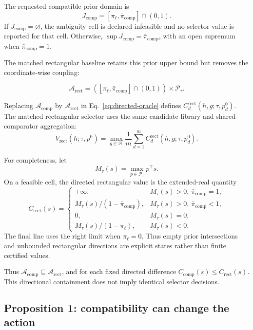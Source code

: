 \documentclass[preprint,review,12pt]{elsarticle}
\newcommand{\Acomp}{\mathcal{A}_{\mathrm{comp}}}
\newcommand{\Arect}{\mathcal{A}_{\mathrm{rect}}}
\newcommand{\Hlib}{\mathcal{H}}
\begin{document}
The requested compatible prior domain is
\[
J_{\mathrm{comp}}=
[\pi_\ell,\bar\pi_{\mathrm{comp}}]\cap(0,1).
\]
If \(J_{\mathrm{comp}}=\varnothing\), the ambiguity cell is declared infeasible
and no selector value is reported for that cell. Otherwise,
\(\sup J_{\mathrm{comp}}=\bar\pi_{\mathrm{comp}}\), with an open supremum when
\(\bar\pi_{\mathrm{comp}}=1\).

The matched rectangular baseline retains this prior upper bound but removes the
coordinate-wise coupling:

\begin{equation}
\Arect=([\pi_\ell,\bar\pi_{\mathrm{comp}}]\cap(0,1))
\times\mathcal{P}_\tau.
\label{eq:rectangular-set}
\end{equation}

Replacing \(\Acomp\) by \(\Arect\) in Eq.~\eqref{eq:directed-oracle} defines
\(C_d^{\mathrm{rect}}(h,g;\tau,p_d^0)\). The matched rectangular selector uses
the same candidate library and shared-comparator aggregation:
\begin{equation}
V_{\mathrm{rect}}(h;\tau,p^0)=
\max_{g\in\Hlib}\frac1m\sum_{d=1}^{m}
C_d^{\mathrm{rect}}(h,g;\tau,p_d^0).
\label{eq:rectangular-selector}
\end{equation}

For completeness, let
\[
M_\tau(s)=\max_{p\in\mathcal{P}_\tau}p^\top s.
\]
On a feasible cell, the directed rectangular value is the extended-real
quantity
\begin{equation}
C_{\mathrm{rect}}(s)=
\begin{cases}
+\infty,
  & M_\tau(s)>0,\ \bar\pi_{\mathrm{comp}}=1,\\
M_\tau(s)/(1-\bar\pi_{\mathrm{comp}}),
  & M_\tau(s)>0,\ \bar\pi_{\mathrm{comp}}<1,\\
0,
  & M_\tau(s)=0,\\
M_\tau(s)/(1-\pi_\ell),
  & M_\tau(s)<0.
\end{cases}
\label{eq:rectangular-closed-form}
\end{equation}
The final line uses the right limit when \(\pi_\ell=0\). Thus empty prior
intersections and unbounded rectangular directions are explicit states rather
than finite certified values.

Thus \(\Acomp\subseteq\Arect\), and for each fixed directed difference
\(C_{\mathrm{comp}}(s)\leq C_{\mathrm{rect}}(s)\). This directional containment
does not imply identical selector decisions.

\subsection{Proposition 1: compatibility can change the action}
\end{document}
